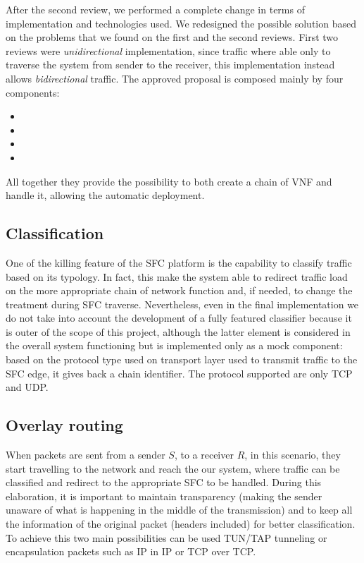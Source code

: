 After the second review, we performed a complete change in terms of
implementation and technologies used. We redesigned the possible solution based
on the problems that we found on the first and the second reviews. First two
reviews were \emph{unidirectional} implementation, since traffic where able
only to traverse the system from sender to the receiver, this implementation
instead allows \emph{bidirectional} traffic. The approved proposal is composed
mainly by four components:
\begin{itemize}
  \item \astaire{}
  \item \harbor{}
  \item \ironhide{}
  \item \roulette{}
\end{itemize}
All together they provide the possibility to both create a chain of VNF and
handle it, allowing the automatic deployment.

\subsection{Classification}
One of the killing feature of the SFC platform is the capability to classify
traffic based on its typology. In fact, this make the system able to redirect
traffic load on the more appropriate chain of network function and, if needed,
to change the treatment during SFC traverse. Nevertheless, even in the final
implementation we do not take into account the development of a fully featured
classifier because it is outer of the scope of this project, although the
latter element is considered in the overall system functioning but is
implemented only as a mock component: based on the protocol type used on
transport layer used to transmit traffic to the SFC edge, it gives back a
chain identifier. The protocol supported are only TCP and UDP.

\subsection{Overlay routing}
When packets are sent from a sender $S$, to a receiver $R$, in this scenario,
they start travelling to the network and reach the our system, where traffic can
be classified and redirect to the appropriate SFC to be handled. During this
elaboration, it is important to maintain transparency (making the sender unaware
of what is happening in the middle of the transmission) and to keep all the
information of the original packet (headers included) for better classification.
To achieve this two main possibilities can be used TUN/TAP tunneling or
encapsulation packets such as IP in IP or TCP over TCP.

